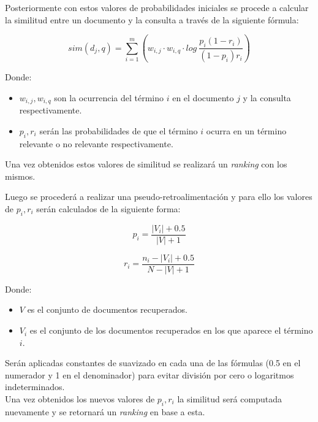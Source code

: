 \documentclass[spanish]{article}
\begin{document}
			Posteriormente con estos valores de probabilidades iniciales se procede a calcular la similitud entre un documento y la consulta a través de la siguiente fórmula:
	
			\begin{equation}
				\displaystyle sim(d_j,q) = \sum_{i=1}^m \left( w_{i,j} \cdot w_{i,q} \cdot log \ \frac{p_i (1 - r_i)}{(1- p_i ) r_i} \right)
			\end{equation}

			Donde:
			\begin{itemize}
				\item $ w_{i,j}, w_{i,q} $ son la ocurrencia del término $ i $ en el documento $ j $ y la consulta respectivamente.

				\item $ p_i, r_i $ serán las probabilidades de que el término $ i $ ocurra en un término relevante o no relevante respectivamente.
			\end{itemize}

			Una vez obtenidos estos valores de similitud se realizará un \emph{ranking} con los mismos. 

			Luego se procederá a realizar una pseudo-retroalimentación y para ello los valores de $ p_i, r_i $ serán calculados de la siguiente forma:

			\begin{equation}
				p_i = \frac{|V_i| + 0.5}{|V| + 1}
			\end{equation}
			
			\begin{equation}
				\displaystyle r_i = \frac{n_i - |V_i| + 0.5}{N - |V| + 1}
			\end{equation}
			
			Donde:

			\begin{itemize}
				\item $ V $ es el conjunto de documentos recuperados.
				\item $ V_i $ es el conjunto de los documentos recuperados en los que aparece el término $ i $.
			\end{itemize}

			Serán aplicadas constantes de suavizado en cada una de las fórmulas (0.5 en el numerador y 1 en el denominador) para evitar división por cero o logaritmos indeterminados.\\
			
			Una vez obtenidos los nuevos valores de $ p_i, r_i $ la similitud será computada nuevamente y se retornará un \emph{ranking} en base a esta.\\
\end{document}
